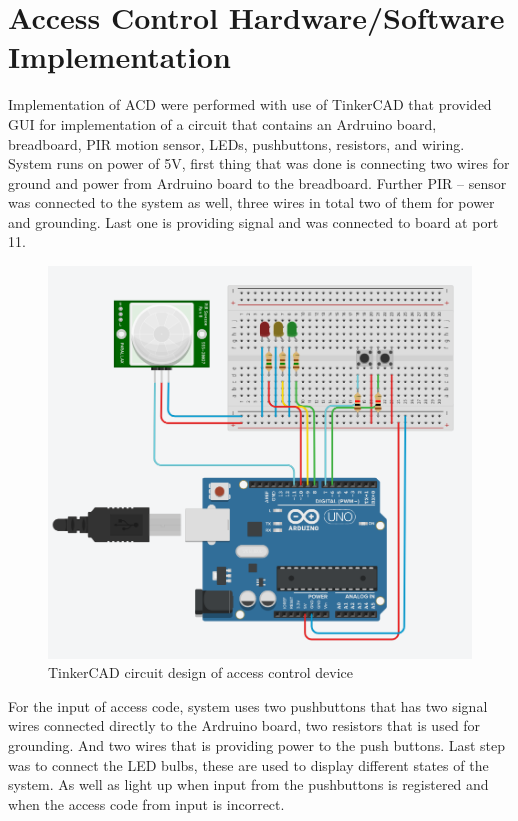 \section{Access Control Hardware/Software Implementation}
\label{sec:ACD_implementation}

Implementation of ACD were performed with use of TinkerCAD that provided GUI for implementation of a circuit that contains an Ardruino board, breadboard, PIR motion sensor, LEDs, pushbuttons, resistors, and wiring. System runs on power of 5V, first thing that was done is connecting two wires for ground and power from Ardruino board to the breadboard. Further PIR – sensor was connected to the system as well, three wires in total two of them for power and grounding. Last one is providing signal and was connected to board at port 11.
\newline

\begin{figure}[h]
  \centering
  \includegraphics[scale=0.5]{figs/ACD_circut.png}
  \caption{TinkerCAD circuit design of access control device}
  \label{fig:framework}
\end{figure}
 
For the input of access code, system uses two pushbuttons that has two signal wires connected directly to the Ardruino board, two resistors that is used for grounding. And two wires that is providing power to the push buttons. Last step was to connect the LED bulbs, these are used to display different states of the system. As well as light up when input from the pushbuttons is registered and when the access code from input is incorrect. 
\newline

